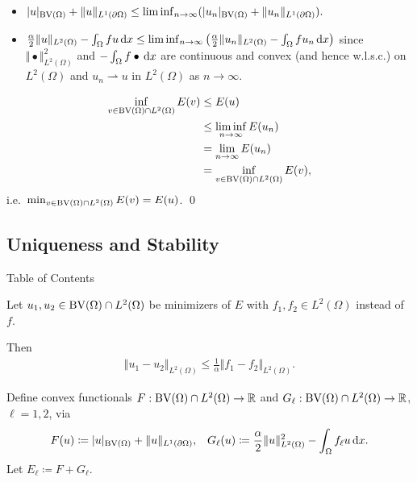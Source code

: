 \documentclass[xcolor=svgnames,english]{beamer}
\begin{document}
\begin{frame}

  \begin{itemize}[label=$\bullet$]
    \item 
      $
    |u|_{\textup{BV}(\Omega)} +\Vert u\Vert_{L^1(\partial\Omega)}
    \leq \liminf_{n\to\infty} (|u_n|_{\textup{BV}(\Omega)} +
    \Vert u_n\Vert_{L^1(\partial\Omega)}).
    $
  \pause
  \item
  $
    \frac{\alpha}{2}\Vert u\Vert_{L^2(\Omega)}-\int_\Omega fu\,\mathrm{d}x
    \leq \liminf_{n\to\infty}
    \left(\frac{\alpha}{2}\Vert u_n\Vert_{L^2(\Omega)}
    -\int_\Omega fu_n\,\mathrm{d}x\right)
    $
  since 
  $\Vert\bullet\Vert_{L^2(\Omega)}^2$ and $-\int_\Omega
  f\bullet\,\mathrm{d}x$ are continuous and convex (and hence w.l.s.c.) on $L^2(\Omega)$
  and $u_n \rightharpoonup u$ in $L^2(\Omega)$ as $n\to\infty$.
  \end{itemize}
  \pause
  
  \begin{align*}
    \inf_{v\in\textup{BV}(\Omega)\cap L^2(\Omega)}E(v)
    &\leq
    E(u)\\
    &\leq\liminf_{n\rightarrow\infty} E(u_n) \\
    &=
    \lim_{n\rightarrow\infty}E(u_n) \\
    &= \inf_{v\in\textup{BV}(\Omega)\cap
    L^2(\Omega)}E(v),
  \end{align*}
  i.e.\ $\min_{v\in\textup{BV}(\Omega)\cap L^2(\Omega)} E(v) = E(u)$. \qed
  
\end{frame}

\subsection{Uniqueness and Stability}
\begin{frame}{Table of Contents}
\end{frame}

\begin{frame}
  \begin{block}{}
  Let $u_1,u_2\in \textup{BV}(\Omega)\cap L^2(\Omega)$ be minimizers
  of $E$ with $f_1,f_2\in L^2(\Omega)$ instead of $f$.

  Then
  \begin{align*}
    \Vert u_1 - u_2\Vert_{L^2(\Omega)} 
    \leq\frac{1}{\alpha}\Vert f_1-f_2\Vert_{L^2(\Omega)}.
  \end{align*}
  \end{block}
  
  \pause
  Define convex functionals $F:\textup{BV}(\Omega)\cap L^2(\Omega)\to \mathbb{R}$
  and
  $G_\ell:\textup{BV}(\Omega)\cap L^2(\Omega)\to \mathbb{R}$, $\ell=1,2$, via
  \begin{align*}
    F(u) &\coloneqq |u|_{\textup{BV}(\Omega)} + \Vert u \Vert_{L^1(\partial\Omega)},&
    G_\ell(u)\coloneqq \frac{\alpha}{2}\Vert u\Vert_{L^2(\Omega)}^2 -
    \int_\Omega f_\ell u\,\mathrm{d}x.
  \end{align*}
  Let $E_\ell\coloneqq F+G_\ell$.
\end{frame}
\end{document}
